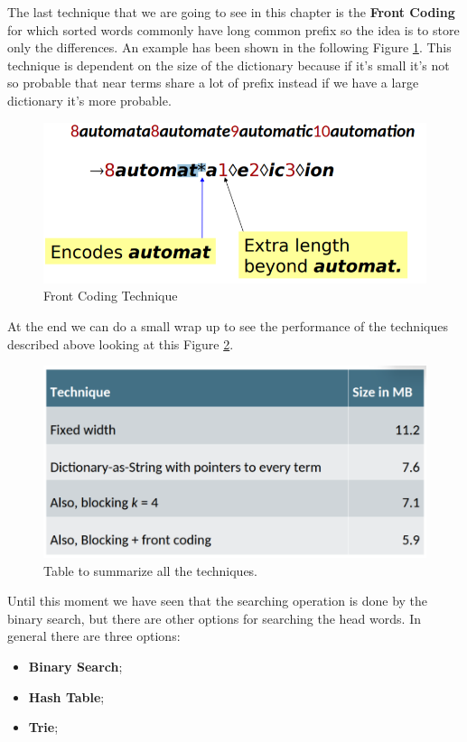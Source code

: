 The last technique that we are going to see in this chapter is the \textbf{Front Coding} for which sorted words commonly have long common prefix so the idea is to store only the differences. An example has been shown in the following Figure \ref{fig:frontcoding}. This technique is dependent on the size of the dictionary because if it's small it's not so probable that near terms share a lot of prefix instead if we have a large dictionary it's more probable.\newline
\begin{figure}
    \centering
    \includegraphics[width=0.75\linewidth]{images/frontcoding.png}
    \caption{Front Coding Technique}
    \label{fig:frontcoding}
\end{figure}
At the end we can do a small wrap up to see the performance of the techniques described above looking at this Figure \ref{fig:wrapupdictionary}.\newline
\begin{figure}
    \centering
    \includegraphics[width=0.75\linewidth]{images/wrapupdictionary.png}
    \caption{Table to summarize all the techniques.}
    \label{fig:wrapupdictionary}
\end{figure}
Until this moment we have seen that the searching operation is done by the binary search, but there are other options for searching the head words. In general there are three options:
\begin{itemize}
    \item \textbf{Binary Search};
    \item \textbf{Hash Table};
    \item \textbf{Trie};
\end{itemize}
